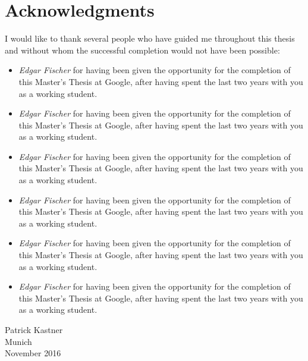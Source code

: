 \chapter*{Acknowledgments}
\enlargethispage*{5cm}

I would like to thank several people who have guided me throughout this thesis and without whom the successful completion would not have been possible:
 

\begin{itemize}

\item \textit{Edgar Fischer}  for having been given the opportunity for the completion of this Master's Thesis at Google, after having spent the last two years with you as a working student.

\item \textit{Edgar Fischer}  for having been given the opportunity for the completion of this Master's Thesis at Google, after having spent the last two years with you as a working student.

\item \textit{Edgar Fischer}  for having been given the opportunity for the completion of this Master's Thesis at Google, after having spent the last two years with you as a working student.

\item \textit{Edgar Fischer}  for having been given the opportunity for the completion of this Master's Thesis at Google, after having spent the last two years with you as a working student.

\item \textit{Edgar Fischer}  for having been given the opportunity for the completion of this Master's Thesis at Google, after having spent the last two years with you as a working student.

\item \textit{Edgar Fischer}  for having been given the opportunity for the completion of this Master's Thesis at Google, after having spent the last two years with you as a working student.



\end{itemize}

\begin{flushright}
	Patrick Kastner\\
	Munich\\ November 2016\\
\end{flushright}

\enlargethispage*{5cm}
 